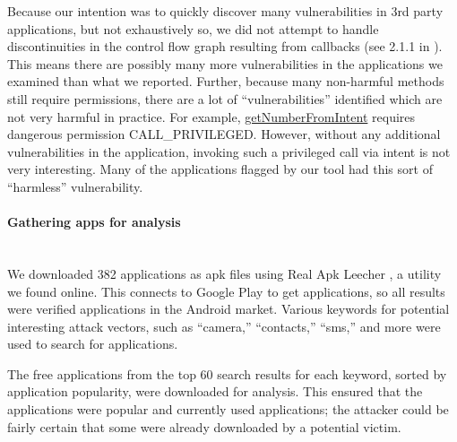 \documentclass[12pt,a4paper]{article}
\begin{document}
Because our intention was to quickly discover many vulnerabilities in 3rd party
applications, but not exhaustively so, we did not attempt to handle
discontinuities in the control flow graph resulting from callbacks (see 2.1.1 in
\cite{grace_systematic_2012}). This means there are possibly many more
vulnerabilities in the applications we examined than what we reported. Further,
because many non-harmful methods still require permissions, there are a lot of
``vulnerabilities'' identified which are not very harmful in practice.  For
example,
\href{https://developer.android.com/reference/android/telephony/PhoneNumberUtils.html#getNumberFromIntent\%28android.content.Intent,\%20android.content.Context\%29}{getNumberFromIntent}
requires dangerous permission CALL\_PRIVILEGED. However, without any additional
vulnerabilities in the application, invoking such a privileged call via intent
is not very interesting. Many of the applications flagged by our tool had this
sort of ``harmless'' vulnerability.

\paragraph{Gathering apps for analysis} ~\\
We downloaded 382 applications as apk files using Real Apk Leecher
\cite{apkleecher}, a utility we found online. This connects to Google Play to
get applications, so all results were verified applications in the Android
market. Various keywords for potential interesting attack vectors, such as
``camera,'' ``contacts,'' ``sms,'' and more were used to search for
applications.

The free applications from the top 60 search results for each keyword, sorted by
application popularity, were downloaded for analysis. This ensured that the
applications were popular and currently used applications; the attacker could be
fairly certain that some were already downloaded by a potential victim.
\end{document}
